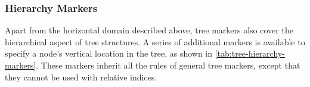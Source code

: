 \documentclass[11pt,a4paper]{article}
\begin{document}
\subsubsection{Hierarchy Markers}
\label{sec:hierarchy-markers}
Apart from the horizontal domain described above, tree markers also cover the hierarchical aspect of tree structures.
A series of additional markers is available to specify a node's vertical location in the tree, as shown in \cref{tab:tree-hierarchy-markers}.
These markers inherit all the rules of general tree markers, except that they cannot be used with relative indices.%
\end{document}
